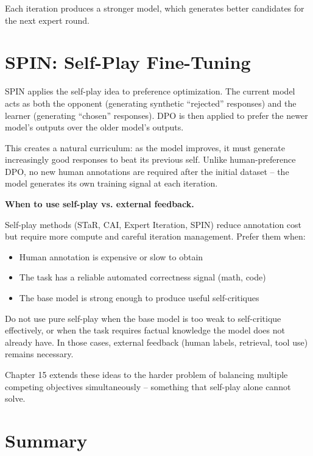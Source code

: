 \begin{chapterenv}
\begin{infobox}
Each iteration produces a stronger model, which generates better candidates for the next expert round.
\end{infobox}

\section{SPIN: Self-Play Fine-Tuning}

SPIN applies the self-play idea to preference optimization. The current model acts as both the opponent (generating synthetic ``rejected'' responses) and the learner (generating ``chosen'' responses). DPO is then applied to prefer the newer model's outputs over the older model's outputs.

This creates a natural curriculum: as the model improves, it must generate increasingly good responses to beat its previous self. Unlike human-preference DPO, no new human annotations are required after the initial dataset -- the model generates its own training signal at each iteration.

\begin{tipbox}
\textbf{When to use self-play vs. external feedback.}

Self-play methods (STaR, CAI, Expert Iteration, SPIN) reduce annotation cost but require more compute and careful iteration management. Prefer them when:
\begin{itemize}
\item Human annotation is expensive or slow to obtain
\item The task has a reliable automated correctness signal (math, code)
\item The base model is strong enough to produce useful self-critiques
\end{itemize}

Do not use pure self-play when the base model is too weak to self-critique effectively, or when the task requires factual knowledge the model does not already have. In those cases, external feedback (human labels, retrieval, tool use) remains necessary.

Chapter 15 extends these ideas to the harder problem of balancing multiple competing objectives simultaneously -- something that self-play alone cannot solve.
\end{tipbox}

\section{Summary}


\end{chapterenv}
